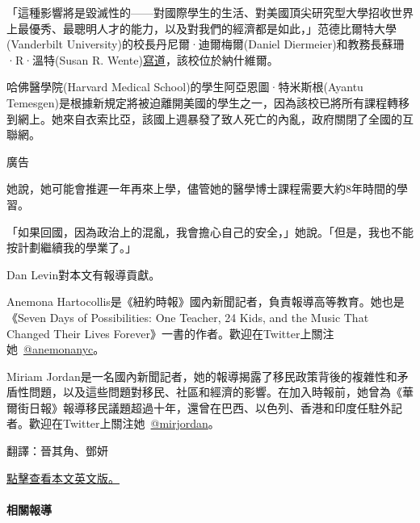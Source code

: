 「這種影響將是毀滅性的------對國際學生的生活、對美國頂尖研究型大學招收世界上最優秀、最聰明人才的能力，以及對我們的經濟都是如此，」范德比爾特大學(Vanderbilt
University)的校長丹尼爾·迪爾梅爾(Daniel
Diermeier)和教務長蘇珊·R·溫特(Susan R.
Wente)\href{https://news.vanderbilt.edu/2020/07/07/vanderbilt-statement-on-ice-guidance-regarding-international-students-and-online-course-this-fall/}{寫道}，該校位於納什維爾。

哈佛醫學院(Harvard Medical School)的學生阿亞恩圖·特米斯根(Ayantu
Temesgen)是根據新規定將被迫離開美國的學生之一，因為該校已將所有課程轉移到網上。她來自衣索比亞，該國上週暴發了致人死亡的內亂，政府關閉了全國的互聯網。

廣告

她說，她可能會推遲一年再來上學，儘管她的醫學博士課程需要大約8年時間的學習。

「如果回國，因為政治上的混亂，我會擔心自己的安全，」她說。「但是，我也不能按計劃繼續我的學業了。」

Dan Levin對本文有報導貢獻。

Anemona
Hartocollis是《紐約時報》國內新聞記者，負責報導高等教育。她也是《Seven
Days of Possibilities: One Teacher, 24 Kids, and the Music That Changed
Their Lives
Forever》一書的作者。歡迎在Twitter上關注她~\href{https://twitter.com/anemonanyc}{@anemonanyc}。

Miriam
Jordan是一名國內新聞記者，她的報導揭露了移民政策背後的複雜性和矛盾性問題，以及這些問題對移民、社區和經濟的影響。在加入時報前，她曾為《華爾街日報》報導移民議題超過十年，還曾在巴西、以色列、香港和印度任駐外記者。歡迎在Twitter上關注她~\href{https://twitter.com/mirjordan}{@mirjordan}。

翻譯：晉其角、鄧妍

\href{https://www.nytimes.com/2020/07/08/us/harvard-mit-trump-ice-students.html}{點擊查看本文英文版。}

\hypertarget{ux76f8ux95dcux5831ux5c0e}{%
\paragraph{相關報導}\label{ux76f8ux95dcux5831ux5c0e}}


